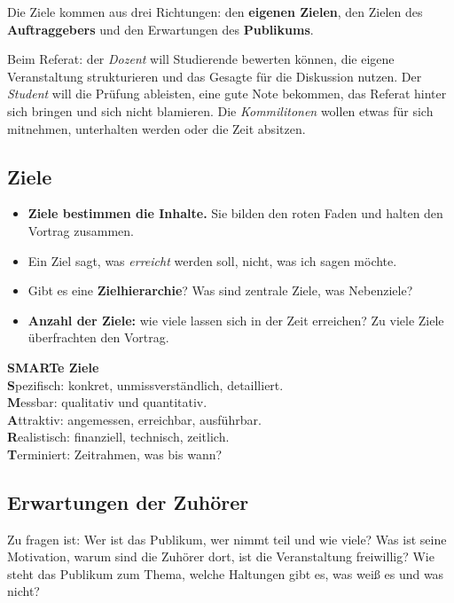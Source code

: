 \documentclass[12pt, a4paper]{article}
\begin{document}
Die Ziele kommen aus drei Richtungen: den \textbf{eigenen Zielen}, den Zielen
des \textbf{Auftraggebers} und den Erwartungen des \textbf{Publikums}.

\begin{examplebox}
Beim Referat: der \emph{Dozent} will Studierende bewerten können, die eigene
Veranstaltung strukturieren und das Gesagte für die Diskussion nutzen. Der
\emph{Student} will die Prüfung ableisten, eine gute Note bekommen, das
Referat hinter sich bringen und sich nicht blamieren. Die \emph{Kommilitonen}
wollen etwas für sich mitnehmen, unterhalten werden oder die Zeit absitzen.
\end{examplebox}

\subsection{Ziele}

\begin{itemize}
  \item \textbf{Ziele bestimmen die Inhalte.} Sie bilden den roten Faden und
        halten den Vortrag zusammen.
  \item Ein Ziel sagt, was \emph{erreicht} werden soll, nicht, was ich sagen
        möchte.
  \item Gibt es eine \textbf{Zielhierarchie}? Was sind zentrale Ziele, was
        Nebenziele?
  \item \textbf{Anzahl der Ziele:} wie viele lassen sich in der Zeit
        erreichen? Zu viele Ziele überfrachten den Vortrag.
\end{itemize}

\begin{definitionbox}
\textbf{SMARTe Ziele}\\
\textbf{S}pezifisch: konkret, unmissverständlich, detailliert.\\
\textbf{M}essbar: qualitativ und quantitativ.\\
\textbf{A}ttraktiv: angemessen, erreichbar, ausführbar.\\
\textbf{R}ealistisch: finanziell, technisch, zeitlich.\\
\textbf{T}erminiert: Zeitrahmen, was bis wann?
\end{definitionbox}

\subsection{Erwartungen der Zuhörer}

Zu fragen ist: Wer ist das Publikum, wer nimmt teil und wie viele? Was ist
seine Motivation, warum sind die Zuhörer dort, ist die Veranstaltung
freiwillig? Wie steht das Publikum zum Thema, welche Haltungen gibt es, was
weiß es und was nicht?
\end{document}
